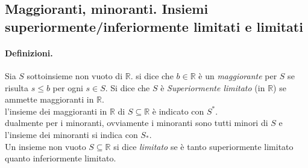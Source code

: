 \documentclass[12pt, a4paper, openany]{book}
\begin{document}
\subsection{Maggioranti, minoranti. Insiemi superiormente/inferiormente limitati e limitati}
\paragraph{Definizioni.} Sia $S$ sottoinsieme non vuoto di $\mathbb{R}$. si dice che $b\in \mathbb{R}$ è un \emph{maggiorante} per $S$ se risulta $s\leq b$ per ogni $s \in S$. Si dice che $S$ è \emph{Superiormente limitato} (in $\mathbb{R}$) se ammette maggioranti in $\mathbb{R}$.
\\l'insieme dei maggioranti in $\mathbb{R}$ di $S\subseteq \mathbb{R}$ è indicato con $S^*$.
\\dualmente per i minoranti, ovviamente i minoranti sono tutti minori di $S$ e l'insieme dei minoranti si indica con $S_*$.
\\Un insieme non vuoto $S \subseteq \mathbb{R}$ si dice \emph{limitato} se è tanto superiormente limitato quanto inferiormente limitato. 
\end{document}
